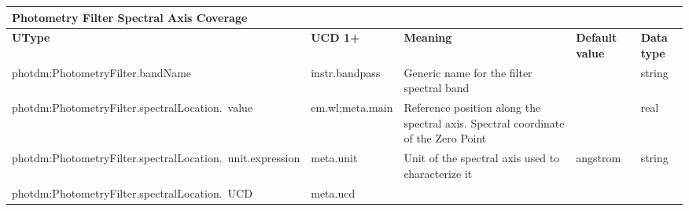 \documentclass[11pt,a4paper]{ivoa}
\begin{document}
\begin{appendices}
\begin{table}[H]
\centering
\begin{adjustbox}{angle=90}
\begin{tabular}{p{2.5in}|p{1.5in}|p{2in}|p{0.74in}|p{0.35in}}
\multicolumn{5}{p{\dimexpr6.59in+8\tabcolsep\relax}}{\centering
{\fontsize{8pt}{8pt}\selectfont \textbf{Photometry Filter Spectral Axis Coverage}}} \\
\hline
\multicolumn{1}{p{2.5in}}{{\fontsize{8pt}{8pt}\selectfont \textbf{UType}}} &
\multicolumn{1}{p{1.5in}}{{\fontsize{8pt}{8pt}\selectfont \textbf{UCD 1+}}} &
\multicolumn{1}{p{2in}}{{\fontsize{8pt}{8pt}\selectfont \textbf{Meaning}}} &
\multicolumn{1}{p{0.74in}}{{\fontsize{8pt}{8pt}\selectfont \textbf{Default value}}} &
\multicolumn{1}{p{0.35in}}{{\fontsize{8pt}{8pt}\selectfont \textbf{Data type}}} \\
\hline
\multicolumn{1}{p{2.5in}}{{\fontsize{8pt}{8pt}\selectfont photdm:PhotometryFilter.bandName}} &
\multicolumn{1}{p{1.5in}}{{\fontsize{8pt}{8pt}\selectfont instr.bandpass }} &
\multicolumn{1}{p{2in}}{{\fontsize{8pt}{8pt}\selectfont Generic name for the
filter spectral band}} &
\multicolumn{1}{p{0.74in}}{} &
\multicolumn{1}{p{0.35in}}{{\fontsize{8pt}{8pt}\selectfont string}} \\
\hline
\multicolumn{1}{p{2.5in}}{{\fontsize{8pt}{8pt}
\selectfont photdm:PhotometryFilter.spectralLocation.\ value}} &
\multicolumn{1}{p{1.5in}}{{\fontsize{8pt}{8pt}\selectfont em.wl;meta.main }} &
\multicolumn{1}{p{2in}}{{\fontsize{8pt}{8pt}\selectfont Reference position along the
spectral axis. Spectral coordinate of the Zero Point }} &
\multicolumn{1}{p{0.74in}}{} &
\multicolumn{1}{p{0.35in}}{{\fontsize{8pt}{8pt}\selectfont real}} \\
\hline
\multicolumn{1}{p{2.5in}}{{\fontsize{8pt}{8pt}
\selectfont photdm:PhotometryFilter.spectralLocation.\ unit.expression}} &
\multicolumn{1}{p{1.5in}}{{\fontsize{8pt}{8pt}\selectfont meta.unit }} &
\multicolumn{1}{p{2in}}{{\fontsize{8pt}{8pt}\selectfont Unit of the spectral axis used
to characterize it}} &
\multicolumn{1}{p{0.74in}}{{\fontsize{8pt}{8pt}\selectfont angstrom}} &
\multicolumn{1}{p{0.35in}}{{\fontsize{8pt}{8pt}\selectfont string}} \\
\hline
\multicolumn{1}{p{2.5in}}{{\fontsize{8pt}{8pt}
\selectfont photdm:PhotometryFilter.spectralLocation.\ UCD}} &
\multicolumn{1}{p{1.5in}}{{\fontsize{8pt}{8pt}\selectfont meta.ucd }} &

\end{tabular}
\end{adjustbox}
\end{table}
\end{appendices}
\end{document}

